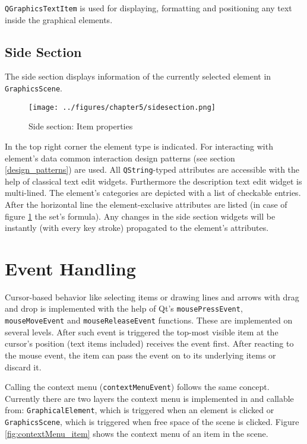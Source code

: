 \documentclass[twoside, openright, 12pt]{book}
\begin{document}
\texttt{QGraphicsTextItem} is used for displaying, formatting and positioning any text inside the graphical elements.



\subsection{Side Section}
\label{implementation_side_section}
The side section displays information of the currently selected element in \texttt{GraphicsScene}.

\begin{figure}[htb]
	\centering
	\texttt{[image: ../figures/chapter5/sidesection.png]}
	\caption{Side section: Item properties}
	\label{fig:sidesection}
\end{figure}

\noindent
In the top right corner the element type is indicated.
For interacting with element's data common interaction design patterns (see section \ref{design_patterns}) are used.
All \texttt{QString}-typed attributes are accessible with the help of classical text edit widgets.
Furthermore the description text edit widget is multi-lined.
The element's categories are depicted with a list of checkable entries.
After the horizontal line the element-exclusive attributes are listed (in case of figure \ref{fig:sidesection} the set's formula).
Any changes in the side section widgets will be instantly (with every key stroke) propagated to the element's attributes.



\section{Event Handling}
\label{implementation_events}
Cursor-based behavior like selecting items or drawing lines and arrows with drag and drop is implemented with the help of Qt's \texttt{mousePressEvent}, \texttt{mouseMoveEvent} and \texttt{mouseReleaseEvent} functions.
These are implemented on several levels.
After such event is triggered the top-most visible item at the cursor's position (text items included) receives the event first.
After reacting to the mouse event, the item can pass the event on to its underlying items or discard it.

Calling the context menu (\texttt{contextMenuEvent}) follows the same concept.
Currently there are two layers the context menu is implemented in and callable from: \texttt{GraphicalElement}, which is triggered when an element is clicked or \texttt{GraphicsScene}, which is triggered when free space of the scene is clicked.
Figure \ref{fig:contextMenu_item} shows the context menu of an item in the scene.
\end{document}
